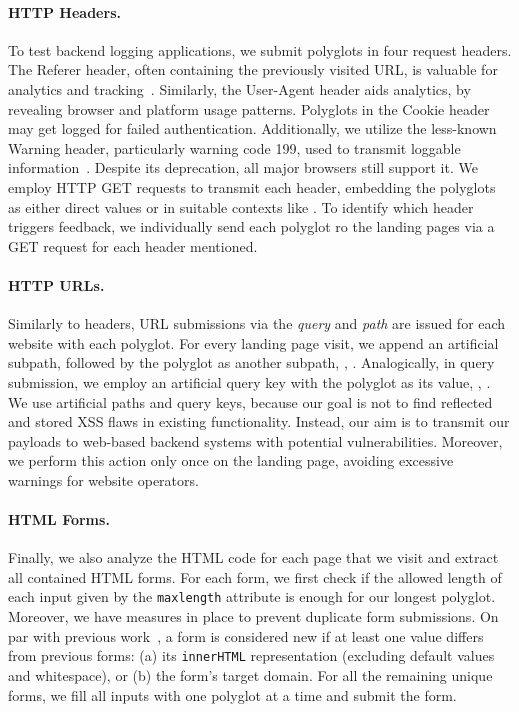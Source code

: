 \vspace{-1em}\paragraph{HTTP Headers.} 
To test backend logging applications, we submit polyglots in four request headers. 
The {Referer} header, often containing the previously visited URL, is valuable for analytics and tracking~\cite{mdn-http-headers-referer}.
Similarly, the {User-Agent} header aids analytics, by revealing browser and platform usage patterns.
Polyglots in the {Cookie} header may get logged for failed authentication.
Additionally, we utilize the less-known {Warning} header, particularly warning code \num{199}, used to transmit loggable information~\cite{mdn-http-headers-warning}.
Despite its deprecation, all major browsers still support it.
We employ HTTP GET requests to transmit each header, embedding the polyglots as either direct values or in suitable contexts like .
To identify which header triggers feedback, we individually send each polyglot ro the landing pages via a GET request for each header mentioned.

\vspace{-1em}\paragraph{HTTP URLs.} 
Similarly to headers, URL submissions via the \emph{query} and \emph{path} are issued for each website with each polyglot.
For every landing page visit, we append an artificial subpath, followed by the polyglot as another subpath, \eg, .
Analogically, in query submission, we employ an artificial query key with the polyglot as its value, \eg, .
We use artificial paths and query keys, because our goal is not to find reflected and stored XSS flaws in existing functionality.
Instead, our aim is to transmit our payloads to web-based backend systems with potential \blindxss{} vulnerabilities.
Moreover, we perform this action only once on the landing page, avoiding excessive warnings for website operators.

\vspace{-1em}\paragraph{HTML Forms.} 
Finally, we also analyze the HTML code for each page that we visit and extract all contained HTML forms.
For each form, we first check if the allowed length of each input given by the \texttt{maxlength} attribute is enough for our longest polyglot.
Moreover, we have measures in place to prevent duplicate form submissions.
On par with previous work~\cite{ssb-2022}, a form is considered new if at least one value differs from previous forms: (a) its \texttt{innerHTML} representation (excluding default values and whitespace), or (b) the form's target domain.
For all the remaining unique forms, we fill all inputs with one polyglot at a time and submit the form.

